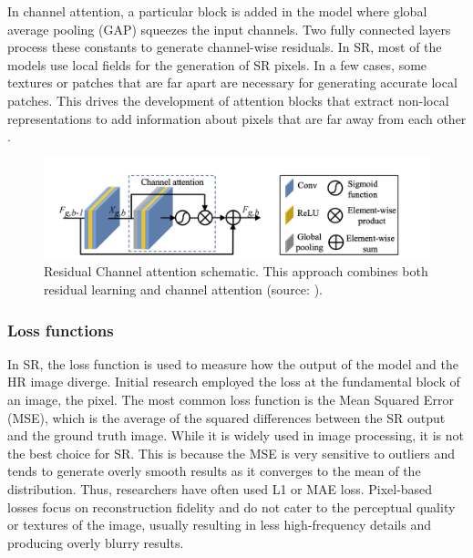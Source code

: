         In channel attention, a particular block is added in the model where global average pooling (GAP) squeezes the input channels. Two fully connected layers process these constants to generate channel-wise residuals.
        In SR, most of the models use local fields for the generation of SR pixels. In a few cases, some textures or patches that are far apart are necessary for generating accurate local patches. This drives the development of attention blocks that extract non-local representations to add information about pixels that are far away from each other \cite{Dai2019}.

        \begin{figure}[H]
            \centering
            \includegraphics[width=\textwidth]{Includes/2-feature-attention.png}
            \caption{Residual Channel attention schematic. This approach combines both residual learning and channel attention (source: \cite{zhang2018image}).}
            \label{fig:2-feature-attention}
        \end{figure}

        \subsubsection{Loss functions}

        In SR, the loss function is used to measure how the output of the model and the HR image diverge. Initial research employed the loss at the fundamental block of an image, the pixel.
        The most common loss function is the Mean Squared Error (MSE), which is the average of the squared differences between the SR output and the ground truth image.
        While it is widely used in image processing, it is not the best choice for SR.
        This is because the MSE is very sensitive to outliers and tends to generate overly smooth results as it converges to the mean of the distribution. Thus, researchers have often used L1 or MAE loss.
        Pixel-based losses focus on reconstruction fidelity and do not cater to the perceptual quality or textures of the image, usually resulting in less high-frequency details and producing overly blurry results.

